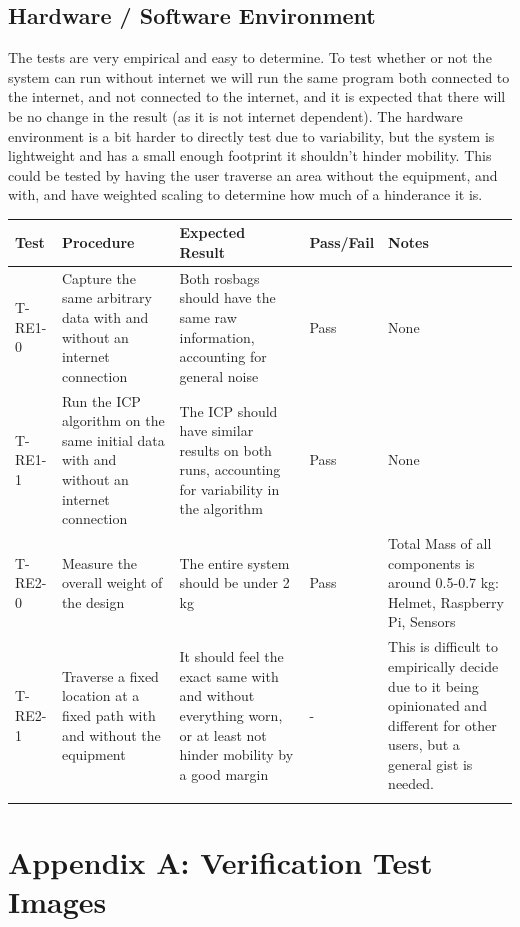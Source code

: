 \documentclass[11pt]{article}
\begin{document}
	\subsection{Hardware / Software Environment}
	
	The tests are very empirical and easy to determine. To test whether or not the system can run without internet we will run the same program both connected to the internet, and not connected to the internet, and it is expected that there will be no change in the result (as it is not internet dependent). The hardware environment is a bit harder to directly test due to variability, but the system is lightweight and has a small enough footprint it shouldn't hinder mobility. This could be tested by having the user traverse an area without the equipment, and with, and have weighted scaling to determine how much of a hinderance it is. \\
	
	\begin{tabularx}{\textwidth}{X p{} p{} X p{}}
		\toprule
		\textbf{Test} & \textbf{Procedure} & \textbf{Expected Result} & \textbf{Pass/Fail} & \textbf{Notes} \\
		\midrule
		T-RE1-0 & Capture the same arbitrary data with and without an internet connection & Both rosbags should have the same raw information, accounting for general noise & Pass & None\\
		\midrule
		T-RE1-1 & Run the ICP algorithm on the same initial data with and without an internet connection & The ICP should have similar results on both runs, accounting for variability in the algorithm & Pass & None \\
		\midrule
		T-RE2-0 & Measure the overall weight of the design & The entire system should be under 2 kg & Pass & Total Mass of all components is around 0.5-0.7 kg: Helmet, Raspberry Pi, Sensors \\
		\midrule
		T-RE2-1 & Traverse a fixed location at a fixed path with and without the equipment & It should feel the exact same with and without everything worn, or at least not hinder mobility by a good margin & - & This is difficult to empirically decide due to it being opinionated and different for other users, but a general gist is needed. \\
		\bottomrule
		\caption{Verification Tests for Hardware/Software Requirements}
	\end{tabularx}
	
	\newpage
	\section{Appendix A: Verification Test Images}
	
\end{document}
